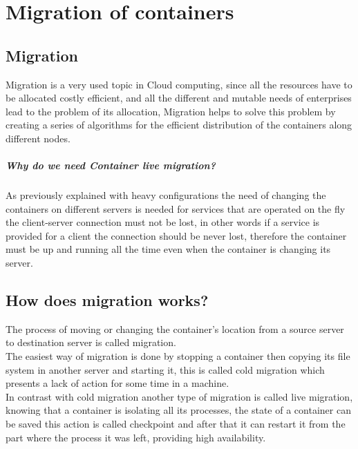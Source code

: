 \chapter{Migration of containers} 

\section{Migration}

Migration is a very used topic in Cloud computing, since all the resources have to be allocated costly efficient, and all the different and mutable needs of enterprises lead to the problem of its allocation, Migration helps to solve this problem by creating a series of algorithms for the efficient distribution of the containers along different nodes.\\

\paragraph{Why do we need Container live migration?}

As previously explained with heavy configurations the need of changing the containers on different servers is needed for services that are operated on the fly the client-server connection must not be lost, in other words if a service is provided for a client the connection should be never lost, therefore the container must be up and running all the time even when the container is changing its server.\\


\section{How does migration works?}
The process of moving or changing the container’s location from a source server to destination server is called migration.\\

The easiest way of migration is done by stopping a container then copying its file system in another server and starting it, this is called cold migration which presents a lack of action for some time in a machine. \\

In contrast with cold migration another type of migration is called live migration, knowing that a container is isolating all its processes, the state of a container can be saved this action is called checkpoint and after that it can restart it from the part where the process it was left, providing high availability.\\

